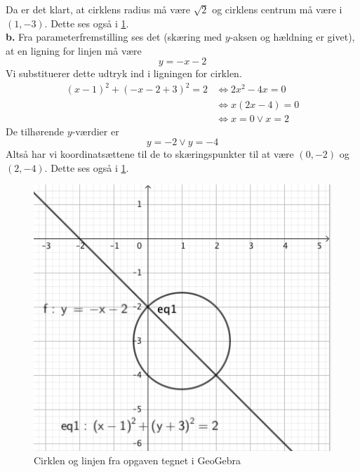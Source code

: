 \documentclass{article}
\begin{document}
Da er det klart, at cirklens radius må være $\sqrt{2} $ og cirklens centrum må være i $(1,-3)$. 
Dette ses også i \cref{fig:cirkel}.\\[1ex]
\textbf{b.}
Fra parameterfremstilling ses det (skæring med $y$-aksen og hældning er givet), at en ligning for linjen må være
\[
y=-x-2
\] 
Vi substituerer dette udtryk ind i ligningen for cirklen.
\begin{equation*}
\begin{split}
  (x-1)^2+(-x-2+3)^2=2 &\iff 2x^2-4x=0\\ 
  &\iff x(2x-4)=0\\ 
  &\iff x=0 \lor x=2
\end{split}
\end{equation*}
De tilhørende $y$-værdier er
\[
y=-2 \lor y=-4
\] 
Altså har vi koordinatsættene til de to skæringspunkter til at være $(0,-2)$ og $(2,-4)$.
Dette ses også i \cref{fig:cirkel}.
\begin{figure}[H]
\begin{center}
  \includegraphics[width=\textwidth]{cirkel.png}
\end{center}
\caption{Cirklen og linjen fra opgaven tegnet i GeoGebra}
\label{fig:cirkel}
\end{figure}
\end{document}
